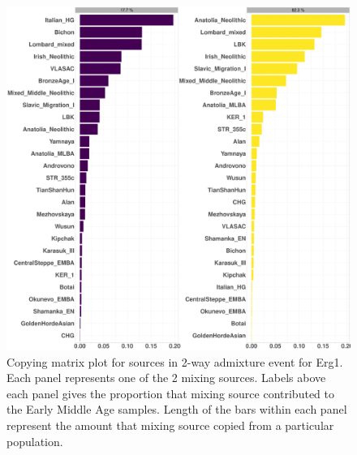\begin{figure}[htp]
    \centering
    \includegraphics[width=1.0\textwidth]{../images/chapter4/Erg1_MU_matrix.pdf}
    \caption{Copying matrix plot for sources in 2-way admixture event for Erg1. Each panel represents one of the 2 mixing sources. Labels above each panel gives the proportion that mixing source contributed to the Early Middle Age samples. Length of the bars within each panel represent the amount that mixing source copied from a particular population.}
    \label{fig:Erg1_MU_matrix}
\end{figure}



